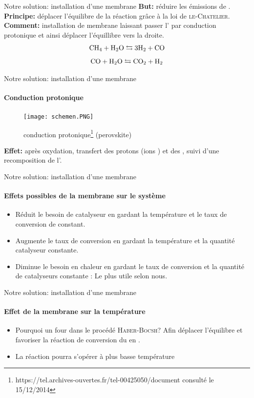 \documentclass{beamer}
\begin{document}
\begin{frame}{Notre solution: installation d'une membrane}
\textbf{But:} réduire les émissions de . \\
\textbf{Principe:} déplacer l'équilibre de la réaction grâce à la loi de \textsc{le-Chatelier}.
\\\textbf{Comment:} installation de membrane laissant passer l' par conduction protonique et ainsi déplacer l'équillibre vers la droite.
$$\ce{CH_4} + \ce{H_2O} \leftrightarrows 3\ce{H_2}+\ce{CO}$$
$$\ce{CO}+\ce{H_2O} \leftrightarrows \ce{CO_2}+\ce{H_2}$$
\end{frame}

\begin{frame}{Notre solution: installation d'une membrane}
\framesubtitle{Conduction protonique}
\begin{figure}[ht!]
 \centering
 \texttt{[image: schemen.PNG]}
 \caption{conduction protonique\footnote{https://tel.archives-ouvertes.fr/tel-00425050/document consulté le 15/12/2014} (perovskite)}
\end{figure}
\textbf{Effet:} après oxydation, transfert des protons (ions ) et des , suivi d'une recomposition de l'.
\end{frame}

\begin{frame}{Notre solution: installation d'une membrane}
\framesubtitle{Effets possibles de la membrane sur le système}
\begin{itemize}
\item Réduit le besoin de catalyseur en gardant la température et le taux de conversion de  constant.
\item Augmente le taux de conversion en gardant la température et la quantité catalyseur constante.
\item Diminue le besoin en chaleur en gardant le taux de conversion et la quantité de catalyseurs constante : Le plus utile selon nous.
\end{itemize}
\end{frame}

\begin{frame}{Notre solution: installation d'une membrane}
\framesubtitle{Effet de la membrane sur la température}
\begin{itemize}
\item Pourquoi un four dans le procédé \textsc{Haber-Bocsh}? Afin déplacer l'équilibre et favoriser la réaction de conversion du  en .
\item La réaction pourra s'opérer à plus basse température
\end{itemize}

\end{frame}
\end{document}
